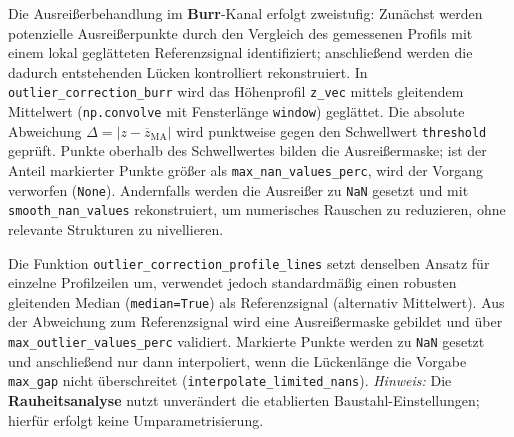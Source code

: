 Die Ausreißerbehandlung im \textbf{Burr}-Kanal erfolgt zweistufig: Zunächst werden potenzielle Ausreißerpunkte durch den Vergleich des gemessenen Profils mit einem lokal geglätteten Referenzsignal identifiziert; anschließend werden die dadurch entstehenden Lücken kontrolliert rekonstruiert. In \texttt{outlier\_correction\_burr} wird das Höhenprofil \texttt{z\_vec} mittels gleitendem Mittelwert (\texttt{np.convolve} mit Fensterlänge \texttt{window}) geglättet. Die absolute Abweichung \(\Delta=\lvert z-\overline{z}_{\text{MA}}\rvert\) wird punktweise gegen den Schwellwert \texttt{threshold} geprüft. Punkte oberhalb des Schwellwertes bilden die Ausreißermaske; ist der Anteil markierter Punkte größer als \texttt{max\_nan\_values\_perc}, wird der Vorgang verworfen (\texttt{None}). Andernfalls werden die Ausreißer zu \texttt{NaN} gesetzt und mit \texttt{smooth\_nan\_values} rekonstruiert, um numerisches Rauschen zu reduzieren, ohne relevante Strukturen zu nivellieren.

Die Funktion \texttt{outlier\_correction\_profile\_lines} setzt denselben Ansatz für einzelne Profilzeilen um, verwendet jedoch standardmäßig einen robusten gleitenden Median (\texttt{median=True}) als Referenzsignal (alternativ Mittelwert). Aus der Abweichung zum Referenzsignal wird eine Ausreißermaske gebildet und über \texttt{max\_outlier\_values\_perc} validiert. Markierte Punkte werden zu \texttt{NaN} gesetzt und anschließend nur dann interpoliert, wenn die Lückenlänge die Vorgabe \texttt{max\_gap} nicht überschreitet (\texttt{interpolate\_limited\_nans}). \emph{Hinweis:} Die \textbf{Rauheitsanalyse} nutzt unverändert die etablierten Baustahl-Einstellungen; hierfür erfolgt keine Umparametrisierung.

